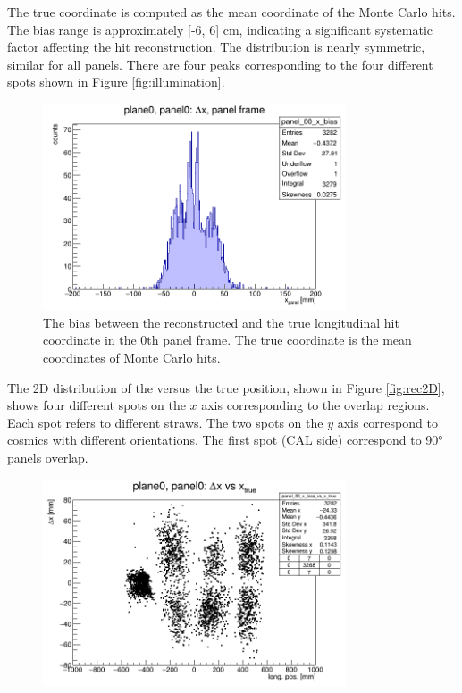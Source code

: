 {The true coordinate is computed as the mean coordinate 
of the Monte Carlo hits. 
The bias range is approximately [-6, 6] cm, 
indicating a significant systematic factor 
affecting the hit reconstruction. The 
distribution is nearly symmetric, similar 
for all panels. 
There are four peaks corresponding to the 
four different spots shown in Figure 
\ref{fig:illumination}.

\begin{figure}[!h]
    \centering
    \includegraphics[width=0.8\textwidth]{figures/png/panel_00_x_bias.png}
    \caption[The bias between the reconstructed and the true hit coordinate.]{The bias between the reconstructed 
    and the true longitudinal hit coordinate in the 0th panel frame. 
    The true coordinate is the mean coordinates of Monte Carlo hits.}
    \label{fig:bias}
\end{figure}
The 2D distribution of the 
%
versus the true position, shown in 
Figure \ref{fig:rec2D}, shows four different 
spots on the $x$ axis corresponding to 
the overlap regions. Each spot refers to 
different straws. The two spots on the $y$ 
axis correspond to cosmics with different orientations. 
The first spot (CAL side) correspond to 90° 
panels overlap.
\begin{figure}[!h]
    \centering
    \includegraphics[width=0.8\textwidth]{figures/png/panel_00_x_bias_vs_x.png}

\end{figure}}
